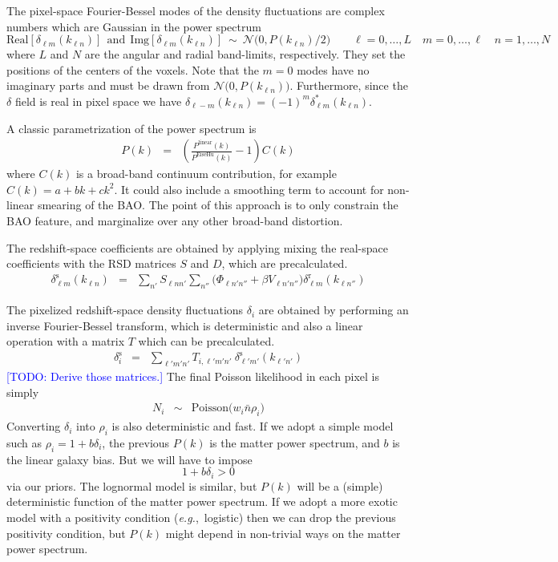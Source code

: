 \documentclass{aastex6}
\newcommand{\eg}{{\textit{e.g.},~}}
\newcommand{\equ}[1]{\begin{equation}#1\end{equation}}
\newcommand{\eqn}[1]{\begin{eqnarray}#1\end{eqnarray}}
\newcommand{\todo}[1]{\textcolor{blue}{[TODO: #1]}}
\begin{document}
The pixel-space Fourier-Bessel modes of the density fluctuations are complex numbers which are Gaussian in the power spectrum
\equ{
	\mathrm{Real}[\delta_{\ell m}(k_{\ell n})] \ \ \mathrm{and} \ \ \mathrm{Img}[\delta_{\ell m}(k_{\ell n})] 	\ \sim \ \mathcal{N}\bigl(0, P(k_{\ell n})/2\bigr)	\quad \quad \ell=0, \dots, L\quad m=0,\dots,\ell\quad n=1,\dots,N
	}
where $L$ and $N$ are the angular and radial band-limits, respectively. They set the positions of the centers of the voxels. 
Note that the $m=0$ modes have no imaginary parts and must be drawn from $ \mathcal{N}\bigl(0, P(k_{\ell n})\bigr)$.
Furthermore, since the $\delta$ field is real in pixel space we have $\delta_{\ell -m}(k_{\ell n}) = (-1)^m \delta_{\ell m}^*(k_{\ell n})$.

A classic parametrization of the power spectrum is 
\eqn{
	P(k) &=&  \left( \frac{P^\mathrm{linear}(k)}{P^\mathrm{EiseHu}(k)}-1 \right)C(k)
}
where $C(k)$ is a broad-band continuum contribution, for example $C(k) = a + bk + ck^2$. It could also include a smoothing term to account for non-linear smearing of the BAO.
The point of this approach is to only constrain the BAO feature, and marginalize over any other broad-band distortion.

The redshift-space coefficients are obtained by applying mixing the real-space coefficients with the RSD matrices $S$ and $D$, which are precalculated.
\eqn{
	\delta^\mathrm{s}_{\ell m}(k_{\ell n}) &=& \sum_{n'} S_{\ell n n'} \sum_{n''} \bigl( \Phi_{\ell n'n''} + \beta V_{\ell n'n''} \bigr) \delta^\mathrm{r}_{\ell m}(k_{\ell n''}) 	
} 

The pixelized redshift-space density fluctuations $\delta_i$ are obtained by performing an inverse Fourier-Bessel transform, which is deterministic and also a linear operation with a matrix $T$ which can be precalculated.
\eqn{
	\delta^\mathrm{s}_i &=& \sum_{\ell'm'n'} T_{i, \ell' m' n'}\ \delta^\mathrm{s}_{\ell' m'}(k_{\ell' n'}) 	
} 
\todo{Derive those matrices.}
The final Poisson likelihood in each pixel is simply
\eqn{
	N_i &\sim& \mathrm{Poisson}\bigl( w_i \bar{n} \rho_i  \bigr)
}
Converting $\delta_i$ into $\rho_i$ is also deterministic and fast. 
If we adopt a simple model such as $\rho_i = 1 + b \delta_i$, the previous $P(k)$ is the matter power spectrum, and $b$ is the linear galaxy bias. 
But we will have to impose
\equ{
	1 + b \delta_i > 0
}
 via our priors.
The lognormal model is similar, but $P(k)$ will be a (simple) deterministic function of the matter power spectrum.
If we adopt a more exotic model with a positivity condition (\eg logistic) then we can drop the previous positivity condition, but $P(k)$  might depend in non-trivial ways on the matter power spectrum.
\end{document}
